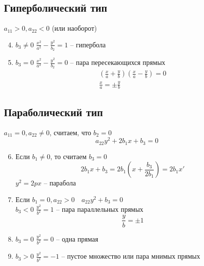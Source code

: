 \documentclass[main]{subfiles}
\begin{document}
\subsection{Гиперболический тип}
$a_{11}>0, a_{22} < 0$ (или наоборот)
\begin{enumerate}
    \setcounter{enumi}{3}
    \item $b_3 \neq 0$ $\frac{x^2}{a^2} - \frac{y^2}{b_2} = 1$ --  гипербола
    \item $b_3 = 0$ $\frac{x^2}{a^2} - \frac{y^2}{b_2} = 0$ -- пара пересекающихся прямых
          \begin{gather*}
              \left(\frac{x}{a}+\frac{y}{b}\right)\left(\frac{x}{a} - \frac{y}{b}\right)=0\\
              \frac{x}{a} = \pm \frac{y}{b}
          \end{gather*}
\end{enumerate}

\subsection{Параболический тип}
$a_{11} = 0, a_{22} \neq 0$, считаем, что $b_2 = 0$
\[a_{22}y^2 + 2b_1x + b_3 = 0\]
\begin{enumerate}
    \setcounter{enumi}{5}
    \item Если $b_1 \neq 0$, то считаем $b_3 = 0$
          \[2b_1x + b_3 = 2b_1\left(x + \frac{b_3}{2b_1}\right) = 2b_1 x'\]
          $y^2 = 2px$ -- парабола
    \item Если $b_1 = 0, a_{22} > 0 \quad a_{22}y^2 + b_3 = 0$ \\
          $b_3 < 0$ $\frac{y^2}{b^2} = 1$ -- пара параллельных прямых
          \[\frac{y}{b} = \pm 1\]
    \item $b_3=0$ $\frac{y^2}{b^2} =0$ -- одна прямая
    \item $b_3>0$ $\frac{y^2}{b^2} =-1$ -- пустое множество или пара мнимых прямых
\end{enumerate}
\end{document}
